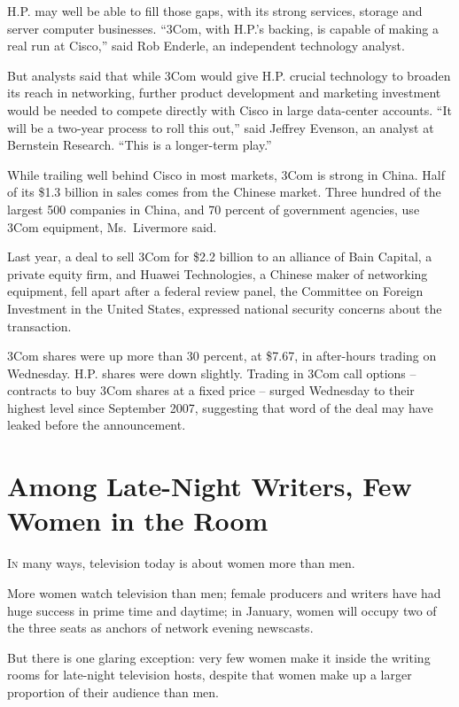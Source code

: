 ﻿\documentclass[12pt]{article}
\begin{document}
H.P. may well be able to fill those gaps, with its strong services, storage and server computer
businesses. ``3Com, with H.P.'s backing, is capable of making a real run at Cisco,'' said Rob
Enderle, an independent technology analyst.

But analysts said that while 3Com would give H.P. crucial technology to broaden its reach in
networking, further product development and marketing investment would be needed to compete directly
with Cisco in large data-center accounts. ``It will be a two-year process to roll this out,'' said
Jeffrey Evenson, an analyst at Bernstein Research. ``This is a longer-term play.''

While trailing well behind Cisco in most markets, 3Com is strong in China. Half of its \$1.3 billion
in sales comes from the Chinese market. Three hundred of the largest 500 companies in China, and 70
percent of government agencies, use 3Com equipment, Ms.~Livermore said.

Last year, a deal to sell 3Com for \$2.2 billion to an alliance of Bain Capital, a private equity
firm, and Huawei Technologies, a Chinese maker of networking equipment, fell apart after a federal
review panel, the Committee on Foreign Investment in the United States, expressed national security
concerns about the transaction.

3Com shares were up more than 30 percent, at \$7.67, in after-hours trading on Wednesday. H.P.
shares were down slightly. Trading in 3Com call options -- contracts to buy 3Com shares at a fixed
price -- surged Wednesday to their highest level since September 2007, suggesting that word of the
deal may have leaked before the announcement.

\section{Among Late-Night Writers, Few Women in the Room}

\lettrine{I}{n} many ways, television today is about women more than men.

More women watch television than men; female producers and writers have had huge success in prime
time and daytime; in January, women will occupy two of the three seats as anchors of network evening
newscasts.

But there is one glaring exception: very few women make it inside the writing rooms for late-night
television hosts, despite that women make up a larger proportion of their audience than men.
\end{document}
